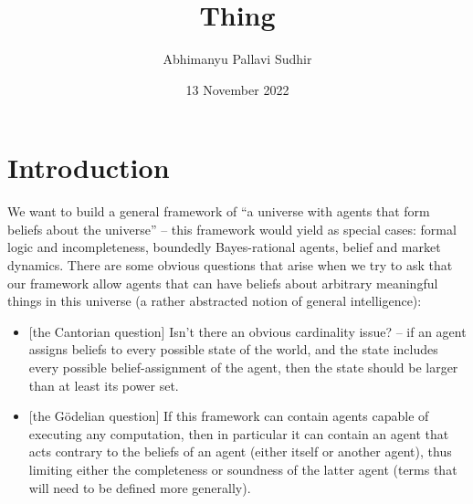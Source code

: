 \documentclass{article}
\title{Thing}
\author{Abhimanyu Pallavi Sudhir}
\date{13 November 2022}
\begin{document}
\maketitle

\section{Introduction}

We want to build a general framework of ``a universe with agents that form beliefs about the universe'' -- this framework would yield as special cases: formal logic and incompleteness, boundedly Bayes-rational agents, belief and market dynamics. There are some obvious questions that arise when we try to ask that our framework allow agents that can have beliefs about arbitrary meaningful things in this universe (a rather abstracted notion of general intelligence):

\begin{itemize}
    \item {[the Cantorian question]} Isn't there an obvious cardinality issue? -- if an agent assigns beliefs to every possible state of the world, and the state includes every possible belief-assignment of the agent, then the state should be larger than at least its power set.
    \item {[the G\"odelian question]} If this framework can contain agents capable of executing any computation, then in particular it can contain an agent that acts contrary to the beliefs of an agent (either itself or another agent), thus limiting either the completeness or soundness of the latter agent (terms that will need to be defined more generally).
\end{itemize}
\end{document}
